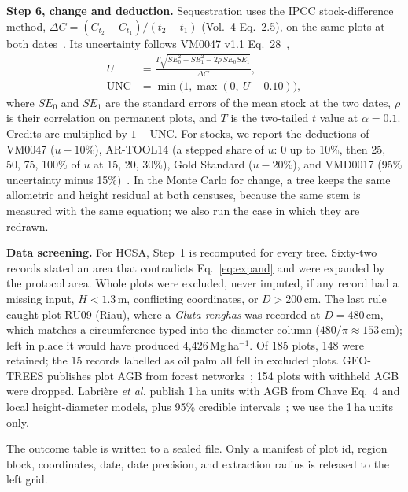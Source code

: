 \documentclass[conference,a4paper]{IEEEtran}
\begin{document}
\textbf{Step 6, change and deduction.} Sequestration uses the IPCC stock-difference method, $\Delta C=(C_{t_2}-C_{t_1})/(t_2-t_1)$ (Vol.~4 Eq.~2.5), on the same plots at both dates~\cite{ipcc2006v4}. Its uncertainty follows VM0047 v1.1 Eq.~28~\cite{verra2025vm0047},
\begin{equation}
\begin{aligned}
U&=\frac{T\sqrt{SE_0^2+SE_1^2-2\rho\,SE_0SE_1}}{\Delta C},\\
\mathrm{UNC}&=\min\big(1,\max(0,\ U-0.10)\big),
\end{aligned}
\label{eq:vm0047}
\end{equation}
where $SE_0$ and $SE_1$ are the standard errors of the mean stock at the two dates, $\rho$ is their correlation on permanent plots, and $T$ is the two-tailed $t$ value at $\alpha=0.1$. Credits are multiplied by $1-\mathrm{UNC}$. For stocks, we report the deductions of VM0047 ($u-10\%$), AR-TOOL14 (a stepped share of $u$: 0 up to 10\%, then 25, 50, 75, 100\% of $u$ at 15, 20, 30\%), Gold Standard ($u-20\%$), and VMD0017 (95\% uncertainty minus 15\%)~\cite{artool14,gs2024ar,vmd0017}. In the Monte Carlo for change, a tree keeps the same allometric and height residual at both censuses, because the same stem is measured with the same equation; we also run the case in which they are redrawn.

\textbf{Data screening.} For HCSA, Step~1 is recomputed for every tree. Sixty-two records stated an area that contradicts Eq.~\ref{eq:expand} and were expanded by the protocol area. Whole plots were excluded, never imputed, if any record had a missing input, $H<1.3$\,m, conflicting coordinates, or $D>200$\,cm. The last rule caught plot RU09 (Riau), where a \textit{Gluta renghas} was recorded at $D=480$\,cm, which matches a circumference typed into the diameter column ($480/\pi\approx153$\,cm); left in place it would have produced 4{,}426\,Mg\,ha$^{-1}$. Of 185 plots, 148 were retained; the 15 records labelled as oil palm all fell in excluded plots. GEO-TREES publishes plot AGB from forest networks~\cite{geotrees2024}; 154 plots with withheld AGB were dropped. Labri\`ere \textit{et al.} publish 1\,ha units with AGB from Chave Eq.~4 and local height-diameter models, plus 95\% credible intervals~\cite{labriere2018insitu}; we use the 1\,ha units only.

The outcome table is written to a sealed file. Only a manifest of plot id, region block, coordinates, date, date precision, and extraction radius is released to the left grid.
\end{document}
